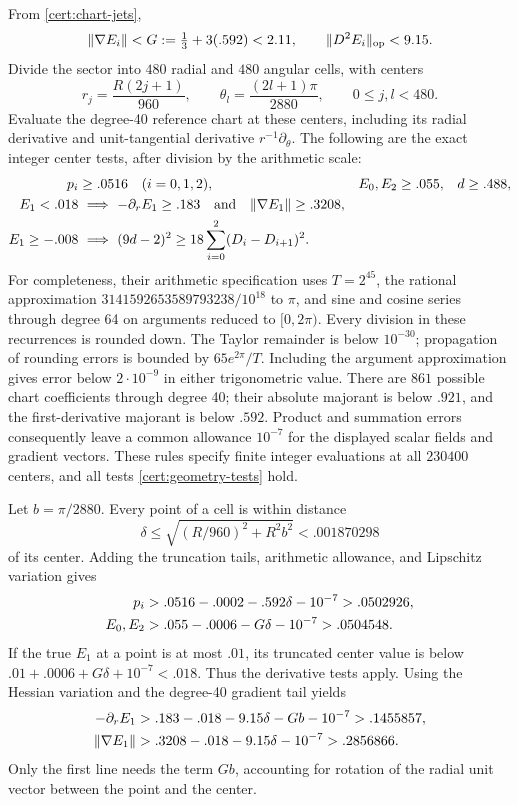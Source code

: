 From \eqref{cert:chart-jets},
\begin{equation}\label{cert:E-jets}
 \|\nabla E_i\|<G:=\tfrac13+3(.592)<2.11,\qquad
 \|D^2E_i\|_{\rm op}<9.15.
\end{equation}
Divide the sector into $480$ radial and $480$ angular cells, with centers
\[
 r_j=\frac{R(2j+1)}{960},\qquad
 \theta_l=\frac{(2l+1)\pi}{2880},\qquad 0\leq j,l<480.
\]
Evaluate the degree-40 reference chart at these centers, including its
radial derivative and unit-tangential derivative $r^{-1}\partial_\theta$.
The following are the exact integer center tests, after division by the
arithmetic scale:
\begin{align}
 p_i&\geq.0516\quad(i=0,1,2),& E_0,E_2&\geq.055,& d&\geq.488,
       \label{cert:geometry-tests}\\
 E_1<.018&\ \Longrightarrow\ -\partial_rE_1\geq.183
               \quad\hbox{and}\quad\|\nabla E_1\|\geq.3208,\notag\\
 E_1\geq-.008&\ \Longrightarrow\ (9d-2)^2
                 \geq18\sum_{i=0}^2(D_i-D_{i+1})^2.\notag
\end{align}
For completeness, their arithmetic specification uses $T=2^{45}$, the
rational approximation $3141592653589793238/10^{18}$ to $\pi$, and
sine and cosine series through degree 64 on arguments reduced to $[0,2\pi)$.
Every division in these recurrences is rounded down.  The Taylor remainder
is below $10^{-30}$; propagation of rounding errors is bounded by
$65e^{2\pi}/T$.  Including the argument approximation gives error below
$2\cdot10^{-9}$ in either trigonometric value.  There are $861$ possible
chart coefficients through degree 40; their absolute majorant is below
$.921$, and the first-derivative majorant is below $.592$.  Product and
summation errors consequently leave a common allowance $10^{-7}$ for
the displayed scalar fields and gradient vectors.  These rules specify
finite integer evaluations at all $230400$ centers, and all tests
\eqref{cert:geometry-tests} hold.

Let $b=\pi/2880$.  Every point of a cell is within distance
\[
 \delta\leq\sqrt{(R/960)^2+R^2b^2}<.001870298
\]
of its center.  Adding the truncation tails, arithmetic allowance, and
Lipschitz variation gives
\begin{align}
 p_i&>.0516-.0002-.592\delta-10^{-7}>.0502926,
       \label{cert:positive-five}\\
 E_0,E_2&>.055-.0006-G\delta-10^{-7}>.0504548.\notag
\end{align}
If the true $E_1$ at a point is at most $.01$, its truncated center value is
below $.01+.0006+G\delta+10^{-7}<.018$.  Thus the derivative tests apply.
Using the Hessian variation and the degree-40 gradient tail yields
\begin{align}
 -\partial_rE_1&>.183-.018-9.15\delta-Gb-10^{-7}>.1455857,
                 \label{cert:radial-slope}\\
 \|\nabla E_1\|&>.3208-.018-9.15\delta-10^{-7}>.2856866.\notag
\end{align}
Only the first line needs the term $Gb$, accounting for rotation of the
radial unit vector between the point and the center.

